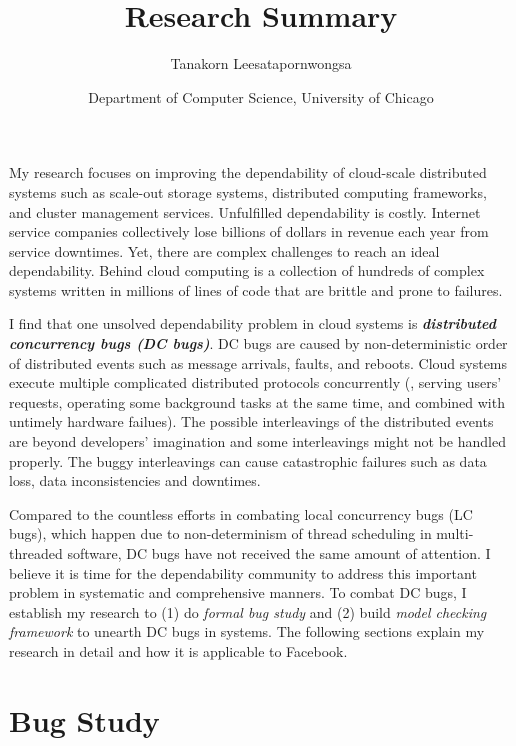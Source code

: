 \documentclass[11pt]{article}
\begin{document}
\title{Research Summary}
\author{Tanakorn Leesatapornwongsa}
\date{\vspace{-1ex} \small{Department of Computer Science, University of
Chicago}}

\maketitle

\vspace{-1ex} 
My research focuses on improving the dependability of cloud-scale distributed
systems such as scale-out storage systems, distributed computing frameworks, and
cluster management services. Unfulfilled dependability is costly. Internet
service companies collectively lose billions of dollars in revenue each year
from service downtimes. Yet, there are complex challenges to reach an ideal
dependability. Behind cloud computing is a collection of hundreds of complex
systems written in millions of lines of code that are brittle and prone to
failures.

I find that one unsolved dependability problem in cloud systems is
\textbf{\textit{distributed concurrency bugs (DC bugs)}}. DC bugs are caused by
non-deterministic order of distributed events such as message arrivals, faults,
and reboots. Cloud systems execute multiple complicated distributed protocols
concurrently (\eg, serving users' requests, operating some background tasks at
the same time, and combined with untimely hardware failues). The possible
interleavings of the distributed events are beyond developers' imagination and
some interleavings might not be handled properly. The buggy interleavings can
cause catastrophic failures such as data loss, data inconsistencies and
downtimes. 

Compared to the countless efforts in combating local concurrency bugs (LC bugs),
which happen due to non-determinism of thread scheduling in multi-threaded
software, DC bugs have not received the same amount of attention. I believe it
is time for the dependability community to address this important problem in
systematic and comprehensive manners. To combat DC bugs, I establish my research
to (1) do \textit{formal bug study} and (2) build \textit{model checking
framework} to unearth DC bugs in systems. The following sections explain my
research in detail and how it is applicable to Facebook.

\section{Bug Study}
\end{document}
